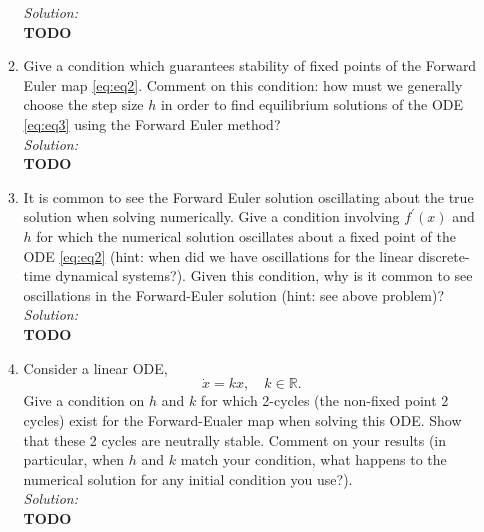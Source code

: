 \documentclass[10pt]{amsart}
\theoremstyle{nonumberplain}
\begin{document}
\begin{enumerate}[label={\bf {\arabic*}:}]
\begin{enumerate}
\textit{Solution:} \\
\textbf{TODO} \\

\item Give a condition which guarantees stability of fixed points of the Forward Euler map \eqref{eq:eq2}. 
Comment on this condition: how must we generally choose the step size $h$ in order to find equilibrium solutions of the ODE \eqref{eq:eq3} using the Forward Euler method? \\

\textit{Solution:} \\
\textbf{TODO} \\

\item It is common to see the Forward Euler solution oscillating about the true solution when solving numerically.
Give a condition involving $f^\prime(x)$ and $h$ for which the numerical solution oscillates about a fixed point of the ODE \eqref{eq:eq2} (hint: when did we have oscillations for the linear discrete-time dynamical systems?).
Given this condition, why is it common to see oscillations in the Forward-Euler solution (hint: see above problem)? \\

\textit{Solution:} \\
\textbf{TODO} \\

\item Consider a linear ODE, 
\begin{equation}
\dot x = kx, \quad k \in \mathbb R.
\label{eq:eq4}
\end{equation}
Give a condition on $h$ and $k$ for which 2-cycles (the non-fixed point 2 cycles) exist for the Forward-Eualer map when solving this ODE.
Show that these 2 cycles are neutrally stable.
Comment on your results (in particular, when $h$ and $k$ match your condition, what happens to the numerical solution for any initial condition you use?). \\

\textit{Solution:} \\
\textbf{TODO} \\

\end{enumerate}
\end{enumerate}
\end{document}
